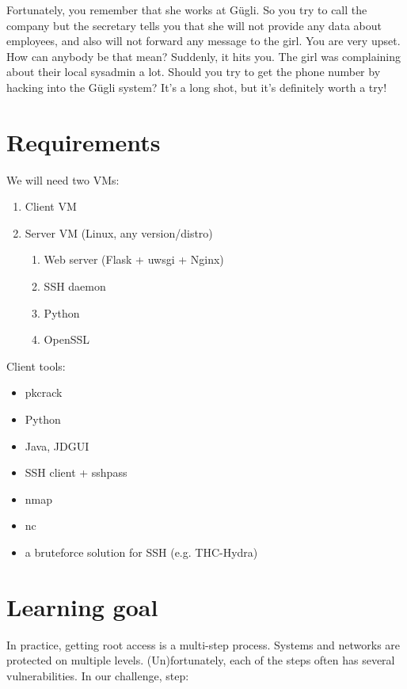 \documentclass[a4paper]{article}
\begin{document}
Fortunately, you remember that she works at Gügli. So you try to call
the company but the secretary tells you that she will not provide any
data about employees, and also will not forward any message to the girl.
You are very upset. How can anybody be that mean? Suddenly, it hits you.
The girl was complaining about their local sysadmin a lot. Should you
try to get the phone number by hacking into the Gügli system? It's a
long shot, but it's definitely worth a try!

\section{Requirements}

\noindent We will need two VMs:

\begin{enumerate}
  \item Client VM
  \item Server VM (Linux, any version/distro)
        \begin{enumerate}
          \item Web server (Flask + uwsgi + Nginx)
          \item SSH daemon
          \item Python
          \item OpenSSL
        \end{enumerate}
\end{enumerate}

\noindent Client tools:

\begin{itemize}
  \item pkcrack
  \item Python
  \item Java, JDGUI
  \item SSH client + sshpass
  \item nmap
  \item nc
  \item a bruteforce solution for SSH (e.g. THC-Hydra)
\end{itemize}

\section{Learning goal}

In practice, getting root access is a multi-step process. Systems and
networks are protected on multiple levels. (Un)fortunately, each of the
steps often has several vulnerabilities. In our challenge, step:
\end{document}
